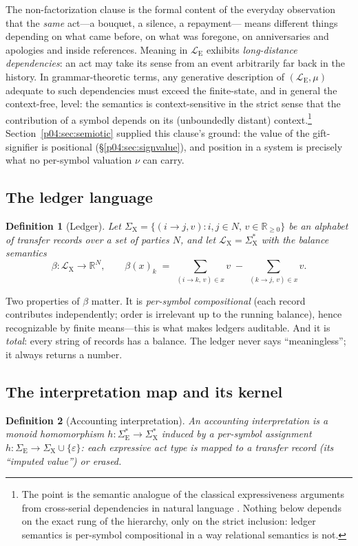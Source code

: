 \documentclass[11pt,a4paper]{article}
\newtheorem{definition}{Definition}
\newcommand{\LE}{\mathcal{L}_{\mathrm{E}}}
\newcommand{\LX}{\mathcal{L}_{\mathrm{X}}}
\newcommand{\SE}{\Sigma_{\mathrm{E}}}
\newcommand{\SX}{\Sigma_{\mathrm{X}}}
\begin{document}
The non-factorization clause is the formal content of the everyday
observation that the \emph{same} act---a bouquet, a silence, a repayment---
means different things depending on what came before, on what was foregone,
on anniversaries and apologies and inside references. Meaning in $\LE$
exhibits \emph{long-distance dependencies}: an act may take its sense from an
event arbitrarily far back in the history. In grammar-theoretic terms, any
generative description of $(\LE,\mu)$ adequate to such dependencies must
exceed the finite-state, and in general the context-free, level: the
semantics is context-sensitive in the strict sense that the contribution of a
symbol depends on its (unboundedly distant) context.\footnote{The point is
the semantic analogue of the classical expressiveness arguments from
cross-serial dependencies in natural language \parencite{shieber1985}. Nothing
below depends on the exact rung of the hierarchy, only on the strict
inclusion: ledger semantics is per-symbol compositional in a way relational
semantics is not.} Section~\ref{p04:sec:semiotic} supplied this clause's ground:
the value of the gift-signifier is positional (\S\ref{p04:sec:signvalue}), and
position in a system is precisely what no per-symbol valuation $\nu$ can
carry.

\subsection{The ledger language}
\begin{definition}[Ledger]
\label{p04:def:ledger}
Let $\SX = \{(i \to j, v) : i,j \in N,\, v \in \mathbb{R}_{\ge 0}\}$ be an
alphabet of \emph{transfer records} over a set of parties $N$, and let
$\LX = \SX^{*}$ with the \emph{balance semantics}
\[
\beta : \LX \to \mathbb{R}^{N}, \qquad
\beta(x)_k \;=\; \sum_{(i\to k,\,v)\in x} v \;-\; \sum_{(k\to j,\,v)\in x} v .
\]
\end{definition}

Two properties of $\beta$ matter. It is \emph{per-symbol compositional}
(each record contributes independently; order is irrelevant up to the
running balance), hence recognizable by finite means---this is what makes
ledgers auditable. And it is \emph{total}: every string of records has a
balance. The ledger never says ``meaningless''; it always returns a number.

\subsection{The interpretation map and its kernel}
\begin{definition}[Accounting interpretation]
\label{p04:def:interp}
An \emph{accounting interpretation} is a monoid homomorphism
$h:\SE^{*}\to\SX^{*}$ induced by a per-symbol assignment
$h:\SE\to\SX\cup\{\varepsilon\}$: each expressive act type is mapped to a
transfer record (its ``imputed value'') or erased.
\end{definition}
\end{document}
